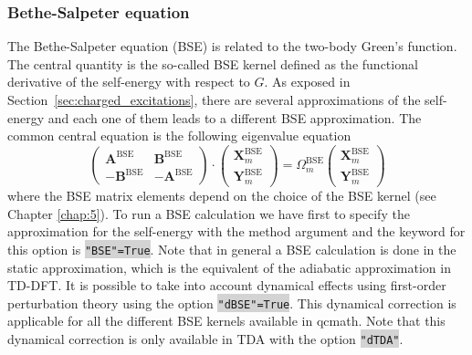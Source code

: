 \documentclass[aip,jcp,reprint,noshowkeys,superscriptaddress]{revtex4-1}
\newcommand{\BSE}{\text{BSE}}
\newcommand{\bX}{\bm{X}}
\newcommand{\bY}{\bm{Y}}
\newcommand{\bA}{\mathbf{A}}
\newcommand{\bB}{\mathbf{B}}
\newcommand{\Ome}{\Omega}
\newcommand{\keyword}[1]{{\colorbox{lightgray}{\texttt{#1}}}}
\begin{document}
\subsubsection*{Bethe-Salpeter equation}
The Bethe-Salpeter equation (BSE) is related to the two-body Green's function. The central quantity is the so-called BSE kernel defined as the functional derivative of the self-energy with respect to $G$. As exposed in Section~\ref{sec:charged_excitations}, there are several approximations of the self-energy and each one of them leads to a different BSE approximation. The common central equation is the following eigenvalue equation
\begin{equation}
    \begin{pmatrix}
    	\bA^{\BSE} & \bB^{\BSE} 
		\\
	    -\bB^{\BSE} & -\bA^{\BSE}
    \end{pmatrix}
	\cdot 
    \begin{pmatrix}
	    \bX_{m}^{\BSE} 
	    \\
	    \bY_{m}^{\BSE}
    \end{pmatrix}
	=
	\Ome_{m}^{\BSE}
	\begin{pmatrix}
		\bX_{m}^{\BSE} 
		\\
		\bY_{m}^{\BSE}
	\end{pmatrix}
\end{equation}
where the BSE matrix elements depend on the choice of the BSE kernel (see Chapter \ref{chap:5}). To run a BSE calculation we have first to specify the approximation for the self-energy with the method argument and the keyword for this option is \keyword{"BSE"=True}. Note that in general a BSE calculation is done in the static approximation, which is the equivalent of the adiabatic approximation in TD-DFT. It is possible to take into account dynamical effects using first-order perturbation theory \cite{Loos_2020h} using the option \keyword{"dBSE"=True}. This dynamical correction is applicable for all the different BSE kernels available in qcmath. Note that this dynamical correction is only available in TDA with the option \keyword{"dTDA"}.

\end{document}
